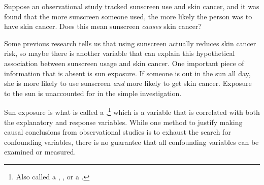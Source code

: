 \begin{exercisewrap}
\begin{nexercise}\label{sunscreenLurkingExample}%
Suppose an observational study tracked sunscreen use and skin cancer, and it was found that the more sunscreen someone used, the more likely the person was to have skin cancer. Does this mean sunscreen \emph{causes} skin cancer?\footnotemark
\end{nexercise}
\end{exercisewrap}

Some previous research tells us that using sunscreen actually reduces skin cancer risk, so maybe there is another variable that can explain this hypothetical association between sunscreen usage and skin cancer. One important piece of information that is absent is sun exposure. If someone is out in the sun all day, she is more likely to use sunscreen \emph{and} more likely to get skin cancer. Exposure to the sun is unaccounted for in the simple investigation.
\begin{center}
\end{center}

Sun exposure is what is called a ,\footnote{Also called a , , or a .} which is a variable that is correlated with both the explanatory and response variables. While one method to justify making causal conclusions from observational studies is to exhaust the search for confounding variables, there is no guarantee that all confounding variables can be examined or measured.


